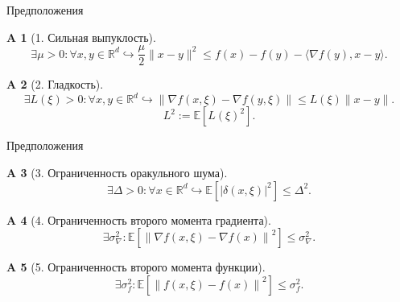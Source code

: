 \documentclass{beamer}
\newtheorem{assumption}{A}
\begin{document}
\begin{frame}{Предположения}

\begin{assumption}[1. Сильная выпуклость] \label{A1}
 \begin{equation}
  \exists \mu > 0: \forall x, y \in \mathbb{R}^d \hookrightarrow \frac{\mu}{2}\|x - y\|^2 \leqslant f(x) - f(y) - \langle \nabla f(y), x - y \rangle.
  \label{mu_strongly_convexity}
 \end{equation}
\end{assumption}

\begin{assumption}[2. Гладкость]\label{A2}
\begin{equation}
    \exists L(\xi) > 0: \forall x, y \in \mathbb{R}^d \hookrightarrow \|\nabla f(x, \xi) - \nabla f(y,\xi)\| \leqslant L(\xi) \|x - y\|.
  \label{l_smoothness_stochastic}
\end{equation}
\begin{equation}
    L^2 := \mathbb{E}\left[L(\xi)^2\right].
\end{equation}
\end{assumption}

\end{frame}


\begin{frame}{Предположения}

\begin{assumption}[3. Ограниченность оракульного шума]\label{A3}
\begin{equation}
    \exists \Delta > 0: \forall x \in \mathbb{R}^d \hookrightarrow \mathbb{E}\left[|\delta(x, \xi)|^2\right] \leqslant \Delta^2.
  \label{bounded_oracle_noise_stochastic}
\end{equation}
\end{assumption}



\begin{assumption}[4. Ограниченность второго момента градиента]\label{A4}
\begin{equation}
    \exists \sigma_\nabla^2: \mathbb{E}\left[\left\|\nabla f(x, \xi) - \nabla f(x)\right\|^2\right] \leqslant \sigma_\nabla^2.
    \label{bounded_second_moment_nabla}
\end{equation}
\end{assumption}

\begin{assumption}[5. Ограниченность второго момента функции]\label{A5}
\begin{equation}
    \exists \sigma_f^2: \mathbb{E}\left[\left\|f(x, \xi) - f(x)\right\|^2\right] \leqslant \sigma_f^2.
    \label{bounded_second_moment_f}
\end{equation}
\end{assumption}
\end{frame}
\end{document}
